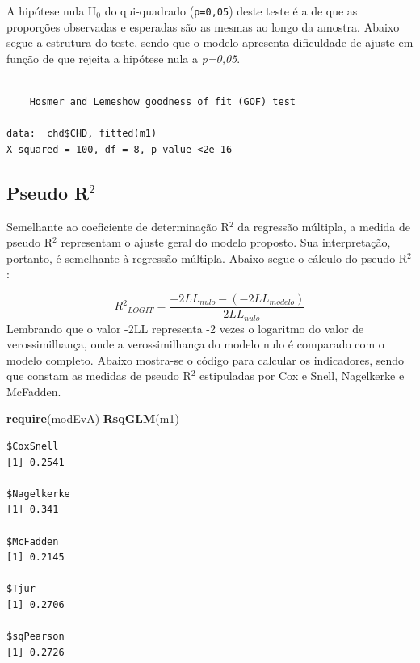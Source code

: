 \documentclass[12pt,brazil,oneside]{book}
\newenvironment{Shaded}{\begin{snugshade}}{\end{snugshade}}
\newcommand{\DataTypeTok}[1]{\textcolor[rgb]{0.13,0.29,0.53}{#1}}
\newcommand{\DecValTok}[1]{\textcolor[rgb]{0.00,0.00,0.81}{#1}}
\newcommand{\KeywordTok}[1]{\textcolor[rgb]{0.13,0.29,0.53}{\textbf{#1}}}
\newcommand{\NormalTok}[1]{#1}
\newcommand{\OperatorTok}[1]{\textcolor[rgb]{0.81,0.36,0.00}{\textbf{#1}}}
\begin{document}
A hipótese nula H\({_0}\) do qui-quadrado (\texttt{p=0,05}) deste teste é a de que as proporções observadas e esperadas são as mesmas ao longo da amostra. Abaixo segue a estrutura do teste, sendo que o modelo apresenta dificuldade de ajuste em função de que rejeita a hipótese nula a \emph{p=0,05}.

\begin{Shaded}
\end{Shaded}

\begin{verbatim}

    Hosmer and Lemeshow goodness of fit (GOF) test

data:  chd$CHD, fitted(m1)
X-squared = 100, df = 8, p-value <2e-16
\end{verbatim}

\hypertarget{pseudo-r2}{%
\subsection{\texorpdfstring{Pseudo R\(^2\)}{Pseudo R\^{}2}}\label{pseudo-r2}}

Semelhante ao coeficiente de determinação R\({^2}\) da regressão múltipla, a medida de pseudo R\({^2}\) representam o ajuste geral do modelo proposto. Sua interpretação, portanto, é semelhante à regressão múltipla. Abaixo segue o cálculo do pseudo R\({^2}\):

\[
R{^2}_{LOGIT} = \frac{-2LL_{nulo}-(-2LL_{modelo})}{-2LL_{nulo}}
\]
Lembrando que o valor -2LL representa -2 vezes o logaritmo do valor de verossimilhança, onde a verossimilhança do modelo nulo é comparado com o modelo completo. Abaixo mostra-se o código para calcular os indicadores, sendo que constam as medidas de pseudo R\({^2}\) estipuladas por Cox e Snell, Nagelkerke e McFadden.

\begin{Shaded}
\begin{Highlighting}[]
\KeywordTok{require}\NormalTok{(modEvA)}
\KeywordTok{RsqGLM}\NormalTok{(m1)}
\end{Highlighting}
\end{Shaded}

\begin{verbatim}
$CoxSnell
[1] 0.2541

$Nagelkerke
[1] 0.341

$McFadden
[1] 0.2145

$Tjur
[1] 0.2706

$sqPearson
[1] 0.2726
\end{verbatim}
\end{document}
